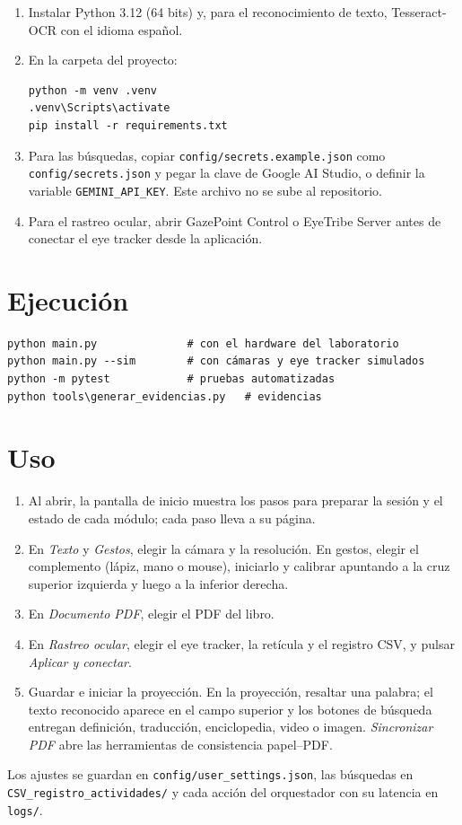 \begin{enumerate}
  \item Instalar Python 3.12 (64 bits) y, para el reconocimiento de texto, Tesseract-OCR con el idioma español.
  \item En la carpeta del proyecto:
\begin{verbatim}
python -m venv .venv
.venv\Scripts\activate
pip install -r requirements.txt
\end{verbatim}
  \item Para las búsquedas, copiar \nolinkurl{config/secrets.example.json} como \nolinkurl{config/secrets.json} y pegar la clave de Google AI Studio, o definir la variable \texttt{GEMINI\_API\_KEY}. Este archivo no se sube al repositorio.
  \item Para el rastreo ocular, abrir GazePoint Control o EyeTribe Server antes de conectar el eye tracker desde la aplicación.
\end{enumerate}

\section{Ejecución}

\begin{verbatim}
python main.py              # con el hardware del laboratorio
python main.py --sim        # con cámaras y eye tracker simulados
python -m pytest            # pruebas automatizadas
python tools\generar_evidencias.py   # evidencias
\end{verbatim}

\section{Uso}

\begin{enumerate}
  \item Al abrir, la pantalla de inicio muestra los pasos para preparar la sesión y el estado de cada módulo; cada paso lleva a su página.
  \item En \textit{Texto} y \textit{Gestos}, elegir la cámara y la resolución. En gestos, elegir el complemento (lápiz, mano o mouse), iniciarlo y calibrar apuntando a la cruz superior izquierda y luego a la inferior derecha.
  \item En \textit{Documento PDF}, elegir el PDF del libro.
  \item En \textit{Rastreo ocular}, elegir el eye tracker, la retícula y el registro CSV, y pulsar \textit{Aplicar y conectar}.
  \item Guardar e iniciar la proyección. En la proyección, resaltar una palabra; el texto reconocido aparece en el campo superior y los botones de búsqueda entregan definición, traducción, enciclopedia, video o imagen. \textit{Sincronizar PDF} abre las herramientas de consistencia papel--PDF.
\end{enumerate}

Los ajustes se guardan en \texttt{config/user\_settings.json}, las búsquedas en \texttt{CSV\_registro\_actividades/} y cada acción del orquestador con su latencia en \texttt{logs/}.
